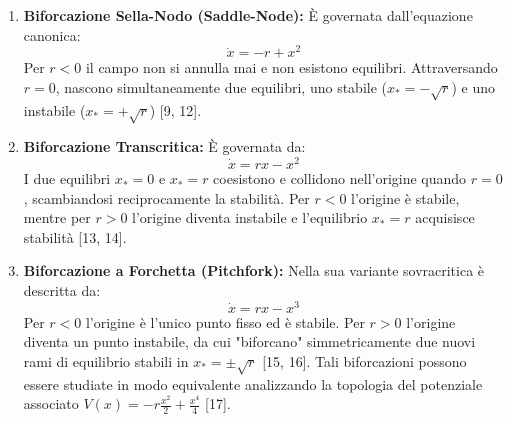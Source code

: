 \documentclass[12pt,a4paper]{article}
\begin{document}
\begin{enumerate}
    \item \textbf{Biforcazione Sella-Nodo (Saddle-Node):} È governata dall'equazione canonica:
    \begin{equation}
    \dot{x} = -r + x^2
    \end{equation}
    Per $r < 0$ il campo non si annulla mai e non esistono equilibri. Attraversando $r = 0$, nascono simultaneamente due equilibri, uno stabile ($x_* = -\sqrt{r}$) e uno instabile ($x_* = +\sqrt{r}$) [9, 12].
    
    \item \textbf{Biforcazione Transcritica:} È governata da:
    \begin{equation}
    \dot{x} = rx - x^2
    \end{equation}
    I due equilibri $x_*=0$ e $x_*=r$ coesistono e collidono nell'origine quando $r=0$, scambiandosi reciprocamente la stabilità. Per $r<0$ l'origine è stabile, mentre per $r>0$ l'origine diventa instabile e l'equilibrio $x_*=r$ acquisisce stabilità [13, 14].
    
    \item \textbf{Biforcazione a Forchetta (Pitchfork):} Nella sua variante sovracritica è descritta da:
    \begin{equation}
    \dot{x} = rx - x^3
    \end{equation}
    Per $r < 0$ l'origine è l'unico punto fisso ed è stabile. Per $r > 0$ l'origine diventa un punto instabile, da cui "biforcano" simmetricamente due nuovi rami di equilibrio stabili in $x_* = \pm\sqrt{r}$ [15, 16]. Tali biforcazioni possono essere studiate in modo equivalente analizzando la topologia del potenziale associato $V(x) = -r\frac{x^2}{2} + \frac{x^4}{4}$ [17].
\end{enumerate}
\end{document}

